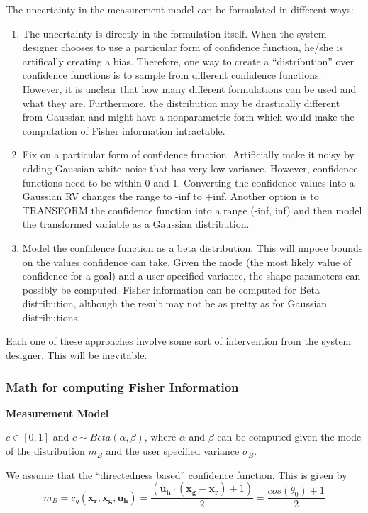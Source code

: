 \documentclass[]{article}
\begin{document}
 \noindent The uncertainty in the measurement model can be formulated in different ways:
 \begin{enumerate}
 	\item The uncertainty is directly in the formulation itself. When the system designer chooses to use a particular form of confidence function, he/she is artifically creating a bias. Therefore, one way to create a ``distribution'' over confidence functions is to sample from different confidence functions. However, it is unclear that how many different formulations can be used and what they are. Furthermore, the distribution may be drastically different from Gaussian and might have a nonparametric form which would make the computation of Fisher information intractable.  
 	\item Fix on a particular form of confidence function. Artificially make it noisy by adding Gaussian white noise that has very low variance. However, confidence functions need to be within 0 and 1. Converting the confidence values into a Gaussian RV changes the range to -inf to +inf. Another option is to TRANSFORM the confidence function into a range (-inf, inf) and then model the transformed variable as a Gaussian distribution. 
 	\item Model the confidence function as a beta distribution. This will impose bounds on the values confidence can take. Given the mode (the most likely value of confidence for a goal) and a user-specified variance, the shape parameters can possibly be computed. Fisher information can be computed for Beta distribution, although the result may not be as pretty as for Gaussian distributions. 
 \end{enumerate}

Each one of these approaches involve some sort of intervention from the system designer. This will be inevitable.

\subsubsection*{Math for computing Fisher Information}

\textbf{Measurement Model}

\noindent $c \in [0, 1]$ and $c\sim  Beta(\alpha, \beta) $, where $\alpha$ and $\beta$ can be computed given the mode of the distribution $m_B$ and the user specified variance $\sigma_B$. 

We assume that the ``directedness based'' confidence function. This is given by 
\begin{equation*}
m_B = c_g(\boldsymbol{x_r}, \boldsymbol{x_g}, \boldsymbol{u_h}) = \frac{(\boldsymbol{u_h}\cdot(\boldsymbol{x_g} - \boldsymbol{x_r}) +  1)}{2} = \frac{cos(\theta_0) + 1}{2}
\end{equation*}
\end{document}

